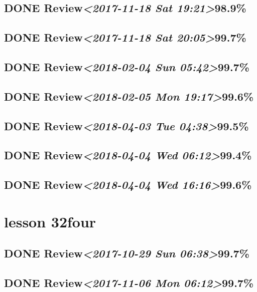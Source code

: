 \documentclass[11pt]{ctexart}
\begin{document}
\subsection{{\bfseries\sffamily DONE} Review\textit{<2017-11-18 Sat 19:21>}98.9\%}
\label{sec:org7a0fd31}
\subsection{{\bfseries\sffamily DONE} Review\textit{<2017-11-18 Sat 20:05>}99.7\%}
\label{sec:orgadadaff}
\subsection{{\bfseries\sffamily DONE} Review\textit{<2018-02-04 Sun 05:42>}99.7\%}
\label{sec:org5b88c46}
\subsection{{\bfseries\sffamily DONE} Review\textit{<2018-02-05 Mon 19:17>}99.6\%}
\label{sec:org079ca89}
\subsection{{\bfseries\sffamily DONE} Review\textit{<2018-04-03 Tue 04:38>}99.5\%}
\label{sec:orgb25070a}
\subsection{{\bfseries\sffamily DONE} Review\textit{<2018-04-04 Wed 06:12>}99.4\%}
\label{sec:org8179976}
\subsection{{\bfseries\sffamily DONE} Review\textit{<2018-04-04 Wed 16:16>}99.6\%}
\label{sec:org32647e1}
\section{lesson 32four}
\label{sec:org20caa34}
\subsection{{\bfseries\sffamily DONE} Review\textit{<2017-10-29 Sun 06:38>}99.7\%}
\label{sec:org63f2f8b}
\subsection{{\bfseries\sffamily DONE} Review\textit{<2017-11-06 Mon 06:12>}99.7\%}
\label{sec:org3786e32}
\end{document}
